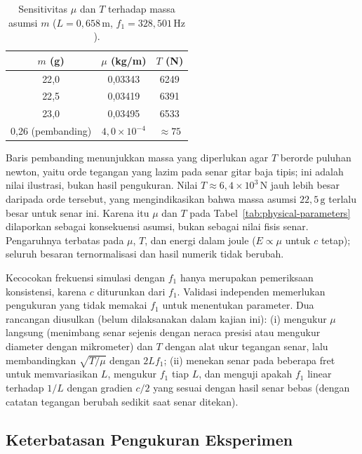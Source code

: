 \documentclass[aps,prl,twocolumn,superscriptaddress]{revtex4-2}
\begin{document}
\begin{table}[htbp]
    \centering
    \caption{Sensitivitas $\mu$ dan $T$ terhadap massa asumsi $m$ ($L=0{,}658\,\mathrm{m}$, $f_1=328{,}501\,\mathrm{Hz}$).}
    \label{tab:sensitivity}
    \begin{tabular}{ccc}
        \hline
        $m$ (g) & $\mu$ (kg/m) & $T$ (N) \\
        \hline
        22{,}0 & 0{,}03343 & 6249 \\
        22{,}5 & 0{,}03419 & 6391 \\
        23{,}0 & 0{,}03495 & 6533 \\
        \hline
        0{,}26 (pembanding) & $4{,}0\times10^{-4}$ & $\approx75$ \\
        \hline
    \end{tabular}
\end{table}

Baris pembanding menunjukkan massa yang diperlukan agar $T$ berorde puluhan newton, yaitu orde tegangan yang lazim pada senar gitar baja tipis; ini adalah nilai ilustrasi, bukan hasil pengukuran. 
Nilai $T\approx6{,}4\times10^3\,\mathrm{N}$ jauh lebih besar daripada orde tersebut, yang mengindikasikan bahwa massa asumsi $22{,}5\,\mathrm{g}$ terlalu besar untuk senar ini. 
Karena itu $\mu$ dan $T$ pada Tabel~\ref{tab:physical-parameters} dilaporkan sebagai konsekuensi asumsi, bukan sebagai nilai fisis senar. 
Pengaruhnya terbatas pada $\mu$, $T$, dan energi dalam joule ($E\propto\mu$ untuk $c$ tetap); seluruh besaran ternormalisasi dan hasil numerik tidak berubah.

Kecocokan frekuensi simulasi dengan $f_1$ hanya merupakan pemeriksaan konsistensi, karena $c$ diturunkan dari $f_1$. 
Validasi independen memerlukan pengukuran yang tidak memakai $f_1$ untuk menentukan parameter. 
Dua rancangan diusulkan (belum dilaksanakan dalam kajian ini): (i) mengukur $\mu$ langsung (menimbang senar sejenis dengan neraca presisi atau mengukur diameter dengan mikrometer) dan $T$ dengan alat ukur tegangan senar, lalu membandingkan $\sqrt{T/\mu}$ dengan $2Lf_1$; (ii) menekan senar pada beberapa fret untuk memvariasikan $L$, mengukur $f_1$ tiap $L$, dan menguji apakah $f_1$ linear terhadap $1/L$ dengan gradien $c/2$ yang sesuai dengan hasil senar bebas (dengan catatan tegangan berubah sedikit saat senar ditekan).

\subsection{Keterbatasan Pengukuran Eksperimen}
\end{document}
